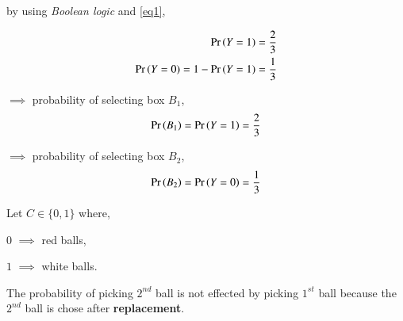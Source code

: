 \documentclass[journal,12pt,twocolumn]{IEEEtran}
\begin{document}
by using \textit{Boolean logic} and \eqref{eq1},

\begin{align}
    \Pr\left(Y=1\right)=\frac{2}{3}\\
    \Pr\left(Y=0\right)=1-\Pr\left(Y=1\right)=\frac{1}{3}
\end{align}


$\implies$ probability of selecting box $B_1$,
\begin{align}\label{eq2}
    \Pr\left(B_1\right)=\Pr\left(Y=1\right)=\frac{2}{3}
\end{align}

$\implies$ probability of selecting box $B_2$,
\begin{align}\label{eq3}
    \Pr\left(B_2\right)=\Pr\left(Y=0\right)=\frac{1}{3}
\end{align}


Let $C \in \{0,1\}$ where, 

$0$ $\implies$ red balls,

$1$ $\implies$ white balls.

\begin{table}[h!]
\centering
\caption{Table of number of balls}
\label{table1}
\end{table}


\begin{table}[h!]
\centering
\caption{Table of probability of taking balls from each box}
\label{Table2}
\end{table}

The probability of picking $2^{nd}$ ball is not effected by picking $1^{st}$ ball because the $2^{nd}$ ball is chose after \textbf{replacement}.
\end{document}
